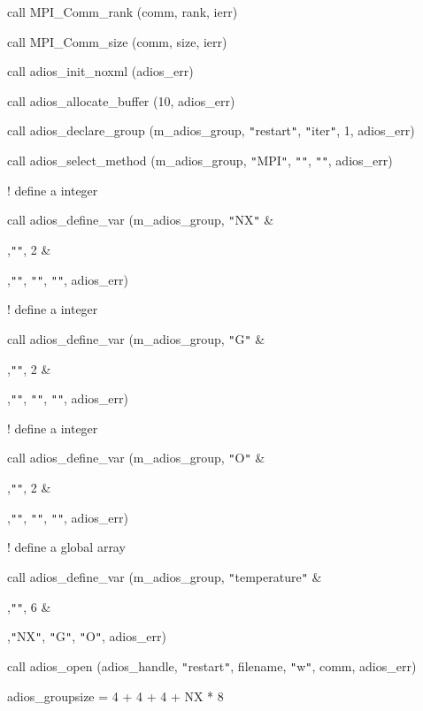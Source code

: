 \parindent=28pt
call MPI\_Comm\_rank (comm, rank, ierr)

\parindent=14pt
call MPI\_Comm\_size (comm, size, ierr)

call adios\_init\_noxml (adios\_err)

\parindent=28pt
call adios\_allocate\_buffer (10, adios\_err)

\parindent=14pt
call adios\_declare\_group (m\_adios\_group, \texttt{"}restart\texttt{"}, \texttt{"}iter\texttt{"}, 
1, adios\_err)

call adios\_select\_method (m\_adios\_group, \texttt{"}MPI\texttt{"}, \texttt{"}\texttt{"}, 
\texttt{"}\texttt{"}, adios\_err)

! define a integer

\parindent=28pt
call adios\_define\_var (m\_adios\_group, \texttt{"}NX\texttt{"} \&

\parindent=93pt
,\texttt{"}\texttt{"}, 2 \&

,\texttt{"}\texttt{"}, \texttt{"}\texttt{"}, \texttt{"}\texttt{"}, adios\_err)

\parindent=108pt
! define a integer

\parindent=14pt
call adios\_define\_var (m\_adios\_group, \texttt{"}G\texttt{"} \&

\parindent=93pt
,\texttt{"}\texttt{"}, 2 \&

,\texttt{"}\texttt{"}, \texttt{"}\texttt{"}, \texttt{"}\texttt{"}, adios\_err)

\parindent=108pt
! define a integer

\parindent=14pt
call adios\_define\_var (m\_adios\_group, \texttt{"}O\texttt{"} \&

\parindent=93pt
,\texttt{"}\texttt{"}, 2 \&

,\texttt{"}\texttt{"}, \texttt{"}\texttt{"}, \texttt{"}\texttt{"}, adios\_err)

\parindent=108pt
! define a global array

\parindent=14pt
call adios\_define\_var (m\_adios\_group, \texttt{"}temperature\texttt{"} \&

\parindent=93pt
,\texttt{"}\texttt{"}, 6 \&

,\texttt{"}NX\texttt{"}, \texttt{"}G\texttt{"}, \texttt{"}O\texttt{"}, adios\_err)

\parindent=108pt
call adios\_open (adios\_handle, \texttt{"}restart\texttt{"}, filename, \texttt{"}w\texttt{"}, 
comm, adios\_err)

\parindent=14pt
adios\_groupsize = 4 + 4 + 4 + NX * 8

